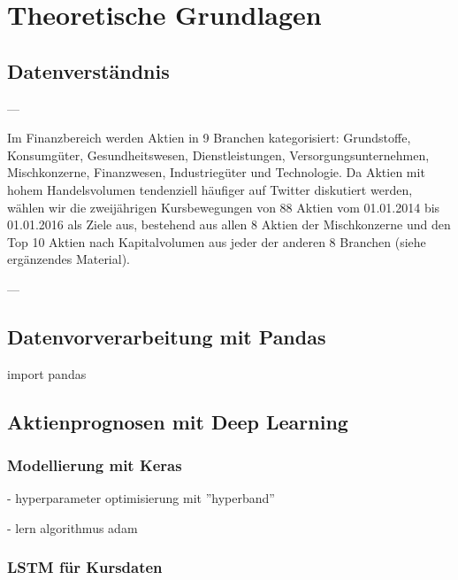 \newpage
\section{Theoretische Grundlagen}\label{sec:theorie}



\subsection{Datenverständnis}\label{sec:theorie_data_understanding}

---

Im Finanzbereich werden Aktien in 9 Branchen kategorisiert: Grundstoffe, Konsumgüter, Gesundheitswesen, Dienstleistungen, Versorgungsunternehmen, Mischkonzerne, Finanzwesen, Industriegüter und Technologie. Da Aktien mit hohem Handelsvolumen tendenziell häufiger auf Twitter diskutiert werden, wählen wir die zweijährigen Kursbewegungen von 88 Aktien vom 01.01.2014 bis 01.01.2016 als Ziele aus, bestehend aus allen 8 Aktien der Mischkonzerne und den Top 10 Aktien nach Kapitalvolumen aus jeder der anderen 8 Branchen (siehe ergänzendes Material).

---
\autocite[Kap. 3]{xu2018StockMovement}

\subsection{Datenvorverarbeitung mit Pandas}\label{sec:theorie_pandas}

import pandas

\subsection{Aktienprognosen mit Deep Learning}\label{sec:theorie_dl}

\subsubsection{Modellierung mit Keras}\label{sec:theorie_keras}
- hyperparameter optimisierung mit ''hyperband''
\autocite{li2018hyperband}

- lern algorithmus adam 
\autocite{website:keras-adam}
\autocite{kingma2015adam}

\subsubsection{LSTM für Kursdaten}\label{sec:theorie_lstm}

